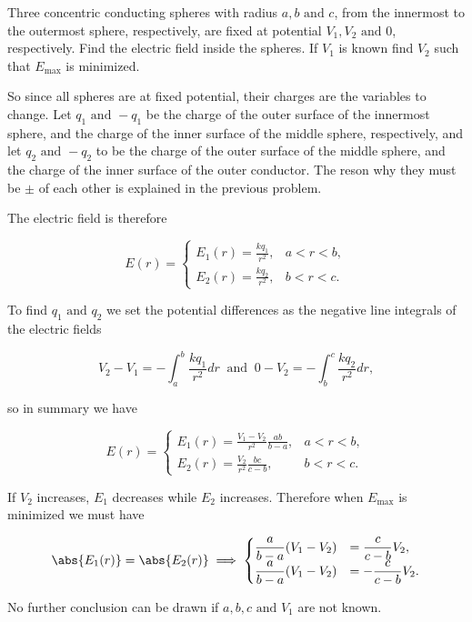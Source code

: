 \documentclass[english,a4paper,12pt]{report}
\begin{document}
{Three concentric conducting spheres with radius \(a,b \text { and } c\), from the innermost to the outermost sphere, respectively, are fixed at potential \(V_1 , V_2 \text { and } 0\), respectively. Find the electric field inside the spheres. If \(V_1 \) is known find \(V_2 \) such that \(E_{\text{max} } \) is minimized.}
{So since all spheres are at fixed potential, their charges are the variables to change. Let \(q_1 \text { and } -q_1 \) be the charge of the outer surface of the innermost sphere, and the charge of the inner surface of the middle sphere, respectively, and let \(q_2 \text { and } -q_2 \) to be the charge of the outer surface of the middle sphere, and the charge of the inner surface of the outer conductor. The reson why they must be \(\pm \) of each other is explained in the previous problem. 

The electric field is therefore 

\begin{equation}
    E (r) = \begin{cases}
        E_1 (r) = \displaystyle \frac{kq_1 }{r^2} ,& a<r<b,\\
        E_2 (r) = \displaystyle \frac{kq_2 }{r^2} ,& b<r<c.
    \end{cases}
\end{equation}

To find \(q_1 \text { and } q_2 \) we set the potential differences as the negative line integrals of the electric fields

\begin{equation}
    V_2 - V_1 = - \int_{a}^{b} \frac{kq_1}{r^2} dr ~\text { and }~ 0-V_2 = - \int_{b}^{c} \frac{kq_2 }{r^2} dr,    
\end{equation}

so in summary we have 

\begin{equation}
    E(r) = \begin{cases}
        E_1(r) = \displaystyle \frac{V_1 - V_2 }{r^2} \frac{ab}{b-a} ,& a<r<b,\\
        E_2(r) = \displaystyle \frac{V_2 }{r^2} \frac{bc}{c-b} ,& b<r<c.
    \end{cases}
\end{equation}

If \(V_2 \) increases, \(E_1 \) decreases while \(E_2 \) increases. Therefore when \(E_{\text{max} } \) is minimized we must have 

\begin{equation}
    \abs{E_1 (r)} = \abs{E_2 (r)} \implies \begin{cases}
        \displaystyle \frac{a}{b-a} (V_1 -V_2 ) &= \displaystyle \frac{c}{c-b} V_2 ,\\
        \displaystyle \frac{a}{b-a} (V_1 -V_2 ) &= \displaystyle -\frac{c}{c-b} V_2 .
    \end{cases}
\end{equation}

No further conclusion can be drawn if \(a,b,c \text { and } V_1 \) are not known. 
} 
\end{document}
